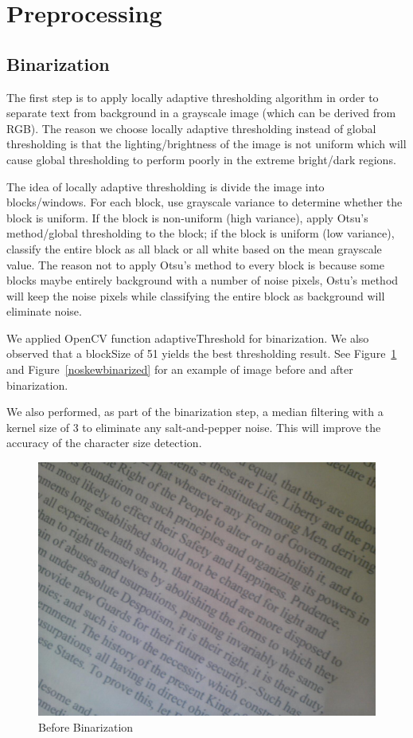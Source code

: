 \documentclass[conference]{IEEEtran}
\begin{document}
\section{Preprocessing}
\subsection{Binarization}

The first step is to apply locally adaptive thresholding algorithm in order to separate text from background in a grayscale image (which can be derived from RGB).  The reason we choose locally adaptive thresholding instead of global thresholding is that the lighting/brightness of the image is not uniform which will cause global thresholding to perform poorly in the extreme bright/dark regions.

The idea of locally adaptive thresholding is divide the image into blocks/windows.  For each block, use grayscale variance to determine whether the block is uniform.  If the block is non-uniform (high variance), apply Otsu's method/global thresholding to the block; if the block is uniform (low variance), classify the entire block as all black or all white based on the mean grayscale value.  The reason not to apply Otsu's method to every block is because some blocks maybe entirely background with a number of noise pixels, Ostu's method will keep the noise pixels while classifying the entire block as background will eliminate noise.

We applied OpenCV function adaptiveThreshold for binarization.  We also observed that a blockSize of 51 yields the best thresholding result.  See Figure~\ref{noskew} and Figure~\ref{noskewbinarized} for an example of image before and after binarization.

We also performed, as part of the binarization step, a median filtering with a kernel size of 3 to eliminate any salt-and-pepper noise.  This will improve the accuracy of the character size detection.

\begin{figure}
\center
\includegraphics[scale=0.15]{test261.jpg}
\caption{Before Binarization}
\label{noskew}
\end{figure}
\end{document}
